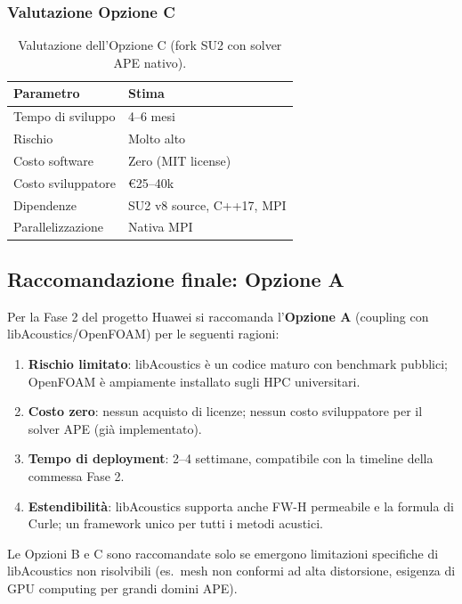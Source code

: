 \documentclass[11pt,a4paper]{article}
\begin{document}
\subsubsection{Valutazione Opzione C}

\begin{table}[H]
  \centering
  \caption{Valutazione dell'Opzione C (fork SU2 con solver APE nativo).}
  \begin{tabular}{ll}
    \toprule
    \textbf{Parametro} & \textbf{Stima} \\
    \midrule
    Tempo di sviluppo & 4–6 mesi \\
    Rischio & Molto alto \\
    Costo software & Zero (MIT license) \\
    Costo sviluppatore & €25–40k \\
    Dipendenze & SU2 v8 source, C++17, MPI \\
    Parallelizzazione & Nativa MPI \\
    \bottomrule
  \end{tabular}
\end{table}

\subsection{Raccomandazione finale: Opzione A}

Per la Fase 2 del progetto Huawei si raccomanda l'\textbf{Opzione A}
(coupling con libAcoustics/OpenFOAM) per le seguenti ragioni:

\begin{enumerate}
  \item \textbf{Rischio limitato}: libAcoustics è un codice maturo con
        benchmark pubblici; OpenFOAM è ampiamente installato sugli HPC
        universitari.
  \item \textbf{Costo zero}: nessun acquisto di licenze; nessun costo
        sviluppatore per il solver APE (già implementato).
  \item \textbf{Tempo di deployment}: 2–4 settimane, compatibile con la
        timeline della commessa Fase 2.
  \item \textbf{Estendibilità}: libAcoustics supporta anche FW-H permeabile
        e la formula di Curle; un framework unico per tutti i metodi acustici.
\end{enumerate}

Le Opzioni B e C sono raccomandate solo se emergono limitazioni specifiche
di libAcoustics non risolvibili (es.\ mesh non conformi ad alta distorsione,
esigenza di GPU computing per grandi domini APE).
\end{document}
